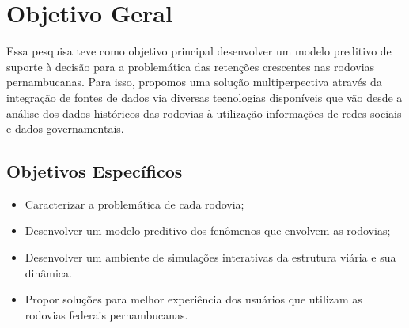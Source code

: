 \section{ Objetivo Geral}\label{intro:objetivo}

Essa pesquisa teve como objetivo principal desenvolver um modelo preditivo de suporte à decisão para a problemática das retenções crescentes nas rodovias pernambucanas. 
Para isso, propomos uma solução multiperpectiva através da integração de fontes de dados via diversas tecnologias disponíveis que vão desde a análise dos dados históricos das 
rodovias à utilização informações de redes sociais e dados governamentais.

\subsection{ Objetivos Específicos}\label{intro:especificos}

\begin{itemize}
 \item Caracterizar a problemática de cada rodovia; 
 \item Desenvolver um modelo preditivo dos fenômenos que envolvem as rodovias;
 \item Desenvolver um ambiente de simulações interativas da estrutura viária e sua dinâmica.
 \item Propor soluções para melhor experiência dos usuários que utilizam as rodovias federais pernambucanas.
\end{itemize}











